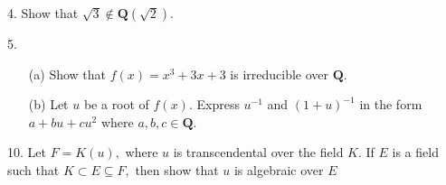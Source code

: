\begin{mdframed}[style=darkQuesion]
  4. Show that $\sqrt{3} \notin \mathbf{Q}(\sqrt{2})$.
\end{mdframed}
\begin{mdframed}[style=darkAnswer,frametitle={Joe Starr}]
\end{mdframed}
\newpage
\begin{mdframed}[style=darkQuesion]
  5. \\
  \begin{itemize}
    \item[(a)]{Show that $f(x)=x^{3}+3 x+3$ is irreducible over $\mathbf{Q}$.}
    \item[(b)]{Let $u$ be a root of $f(x)$. Express $u^{-1}$ and $(1+u)^{-1}$ in the form $a+b u+c u^{2}$ where $a, b, c \in \mathbf{Q}$.}
  \end{itemize}
\end{mdframed}
\begin{mdframed}[style=darkAnswer,frametitle={Joe Starr}]
\end{mdframed}
\newpage
\begin{mdframed}[style=darkQuesion]
  10. Let $F=K(u),$ where $u$ is transcendental over the field $K .$ If $E$ is a field such that $K \subset E \subseteq F,$ then show that $u$ is algebraic over $E$
\end{mdframed}
\begin{mdframed}[style=darkAnswer,frametitle={Joe Starr}]
\end{mdframed}
\newpage

